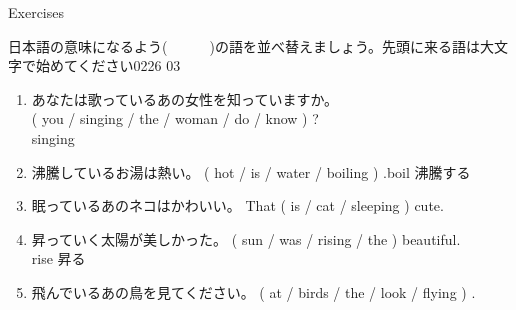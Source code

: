 \documentclass[aspectratio=169,xcolor={dvipsnames,table}]{beamer}
\begin{document}
\begin{frame}[plain]{Exercises}

  {\small 日本語の意味になるよう(~~~~~~)の語を並べ替えましょう。先頭に来る語は大文字で始めてください}\hfill{\tiny 0226}\,{\scriptsize {}}\,{\tiny 03}
  \begin{enumerate}
    \item {\small あなたは歌っているあの女性を知っていますか。}\\
          ( you / singing / the / woman / do / know ) ?\\
          \hfill{\scriptsize singing }
    \item {\small 沸騰しているお湯は熱い。}
          ( hot / is / water / boiling ) .\hfill{\scriptsize boil  沸騰する}\\
    \item {\small 眠っているあのネコはかわいい。}
          That ( is / cat / sleeping ) cute.\\
    \item {\small 昇っていく太陽が美しかった。}
          ( sun / was / rising  / the ) beautiful.\\
          \hfill{\scriptsize rise  昇る}
    \item {\small 飛んでいるあの鳥を見てください。}
          ( at / birds / the / look / flying ) .\\
  \end{enumerate}
\end{frame}
\end{document}
